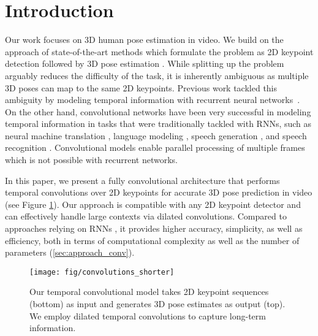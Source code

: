 \documentclass[10pt,twocolumn,letterpaper]{article}
\begin{document}
\section{Introduction}
Our work focuses on 3D human pose estimation in video. 
We build on the approach of
state-of-the-art methods which formulate the problem as 2D
keypoint detection followed by 3D pose estimation \cite{pavlakos:coarse:2017,tekin:learning:2017,martinez:simple:2017,sun:compositional:2017,fang:learning:2018,pavlakos:ordinal:2018,yang:3d:2018,luvizon:2d:2018}.
While
splitting up the problem arguably reduces the difficulty of
the task, it is inherently ambiguous as multiple 3D poses
can map to the same 2D keypoints.
Previous work tackled this ambiguity by modeling temporal information with recurrent neural networks~\cite{hossain:exploiting:2018,lee:propagating:2018}.
On the other hand, convolutional networks have been very successful in modeling temporal information in tasks that were traditionally tackled with RNNs, such as neural machine translation \cite{gehring:convs2s:2017}, language modeling \cite{dauphin:gatedlm:2017}, speech generation \cite{oord:wavenet:2016}, and speech recognition \cite{collobert:wav2letter:2016}.
Convolutional models enable parallel processing of multiple frames which is not possible with recurrent networks.

In this paper, we present a fully convolutional architecture that performs temporal convolutions over 2D keypoints for accurate 3D pose prediction in video (see Figure \ref{fig:convolutions}).
Our approach is compatible with any 2D keypoint detector and can effectively handle large contexts via dilated convolutions. 
Compared to approaches relying on RNNs \cite{hossain:exploiting:2018,lee:propagating:2018}, it provides higher accuracy, simplicity, as well as efficiency, both in terms of computational complexity as well as the number of parameters (\textsection\ref{sec:approach_conv}).
\begin{figure}[t]
	\centering
	\vspace{10pt}
\texttt{[image: fig/convolutions\_shorter]}
	\caption{Our temporal convolutional model takes 2D keypoint sequences (bottom) as input and generates 3D pose estimates as output (top). We employ dilated temporal convolutions to capture long-term information. }
\label{fig:convolutions}
\end{figure}
\end{document}

